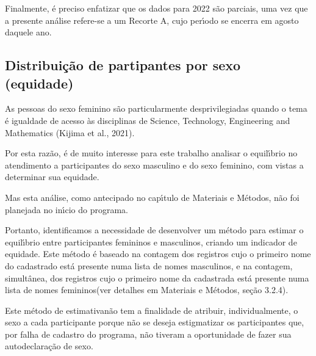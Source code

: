 \documentclass[
12pt,		%
openright,	%
twoside,  %
a4paper,			%
chapter=TITLE,		%
english,			%
french,				%
spanish,			%
brazil				%
]{USPSC-classe/USPSC}
\begin{document}
Finalmente, \'e preciso enfatizar que os dados para 2022 s\~ao parciais, uma vez que a presente an\'alise refere-se a um Recorte A, cujo per\'{\i}odo se encerra em agosto daquele ano.








\subsection[Distribui\c{c}\~ao de partipantes por sexo (equidade)]{Distribui\c{c}\~ao de partipantes por sexo (equidade)}\label{Distribui\c{c}\~ao de partipantes por sexo (equidade)}
As pessoas do sexo feminino s\~ao particularmente desprivilegiadas quando o tema \'e igualdade de acesso \`as disciplinas de Science, Technology, Engineering and Mathematics (Kijima et al., 2021).








Por esta raz\~ao, \'e de muito interesse para este trabalho analisar o equil\'{\i}brio no atendimento a participantes do sexo masculino e do sexo feminino, com vistas a determinar sua equidade.








Mas esta an\'alise, como antecipado no cap\'{\i}tulo de Materiais e M\'etodos, n\~ao foi planejada no in\'{\i}cio do programa.








Portanto, identificamos a necessidade de desenvolver um m\'etodo para estimar o equil\'{\i}brio entre participantes femininos e masculinos, criando um indicador de equidade. Este m\'etodo \'e baseado na contagem dos registros cujo o primeiro nome do cadastrado est\'a presente numa lista de \textquotedbl nomes masculinos\textquotedbl , e na contagem, simult\^anea, dos registros cujo o primeiro nome da cadastrada est\'a presente numa lista de \textquotedbl nomes femininos\textquotedbl  (ver detalhes em Materiais e M\'etodos, se\c{c}\~ao 3.2.4).








Este m\'etodo de \textquotedbl estimativa\textquotedbl  n\~ao tem a finalidade de atribuir, individualmente, o sexo a cada participante porque n\~ao se deseja estigmatizar os participantes que, por falha de cadastro do programa, n\~ao tiveram a oportunidade de fazer sua autodeclara\c{c}\~ao de sexo.
\end{document}

